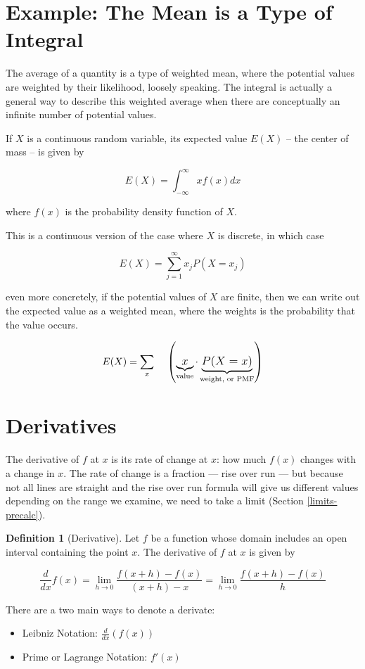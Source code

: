 \documentclass[
]{book}
\providecommand{\tightlist}{%
  \setlength{\itemsep}{0pt}\setlength{\parskip}{0pt}}
\theoremstyle{definition}
\newtheorem{definition}{Definition}[chapter]
\theoremstyle{definition}
\theoremstyle{definition}
\theoremstyle{remark}
\begin{document}
\hypertarget{example-the-mean-is-a-type-of-integral}{%
\section*{Example: The Mean is a Type of Integral}\label{example-the-mean-is-a-type-of-integral}}

The average of a quantity is a type of weighted mean, where the potential values are weighted by their likelihood, loosely speaking. The integral is actually a general way to describe this weighted average when there are conceptually an infinite number of potential values.

If \(X\) is a continuous random variable, its expected value \(E(X)\) -- the center of mass -- is given by

\[E(X) = \int^{\infty}_{-\infty}x f(x) dx\]

where \(f(x)\) is the probability density function of \(X\).

This is a continuous version of the case where \(X\) is discrete, in which case

\[E(X) = \sum^\infty_{j=1} x_j P(X = x_j)\]

even more concretely, if the potential values of \(X\) are finite, then we can write out the expected value as a weighted mean, where the weights is the probability that the value occurs.

\[E(X) = \large \sum_{x} \quad\left( \underbrace{x}_{\text{value}}\cdot \underbrace{P(X = x)}_{\text{weight, or PMF}}\right)\]

\hypertarget{derivintro}{%
\section{Derivatives}\label{derivintro}}

The derivative of \(f\) at \(x\) is its rate of change at \(x\): how much \(f(x)\) changes with a change in \(x\). The rate of change is a fraction --- rise over run --- but because not all lines are straight and the rise over run formula will give us different values depending on the range we examine, we need to take a limit (Section \ref{limits-precalc}).

\begin{definition}[Derivative]
\protect\hypertarget{def:unnamed-chunk-15}{}{\label{def:unnamed-chunk-15} {} }Let \(f\) be a function whose domain includes an open interval containing the point \(x\). The derivative of \(f\) at \(x\) is given by

\[\frac{d}{dx}f(x) =\lim\limits_{h\to 0} \frac{f(x+h)-f(x)}{(x+h)-x} = \lim\limits_{h\to 0} \frac{f(x+h)-f(x)}{h}
\]

There are a two main ways to denote a derivate:

\begin{itemize}
\tightlist
\item
  Leibniz Notation: \(\frac{d}{dx}(f(x))\)
\item
  Prime or Lagrange Notation: \(f'(x)\)
\end{itemize}
\end{definition}
\end{document}
